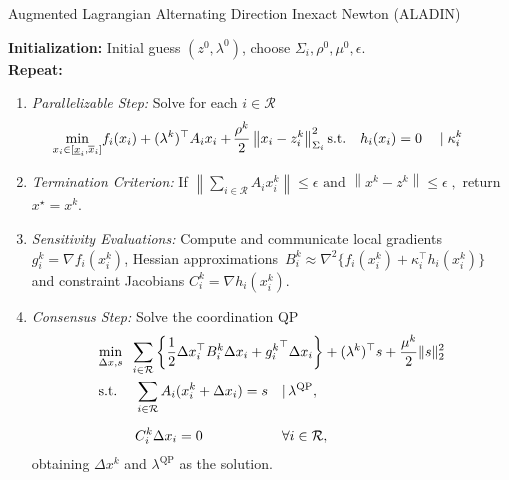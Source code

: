 \documentclass[]{scrartcl}
\begin{document}
\begin{algorithm}
	
	\caption{Augmented Lagrangian Alternating Direction Inexact Newton (ALADIN)}
	\textbf{Initialization:} Initial guess $(z^0,\lambda^0)$, choose $\Sigma_i,\rho^0,\mu^0,\epsilon$. \\
	\textbf{Repeat:}
	\begin{enumerate}
		\item \textit{Parallelizable Step:} \label{step:parStep}
		Solve for each $i \in \mathcal{R}$
		\begin{align}
		\begin{split}
		\label{eq::denlp}
		\underset{x_i\in[\underline x_i, \overline x_i]}{\min}& f_i(x_i) + (\lambda^k)^\top A_i x_i + \hspace{-0.1em} \frac{\rho^k}{2}\left\|x_i-z_i^k\right\|_{\Sigma_i}^2
		\text{s.t.}\quad h_i(x_i) = 0 \quad \mid \kappa_i^k \quad 
		\end{split}	
		\end{align}
		\item \textit{Termination Criterion:} If 
		$
		\label{eq::stop}
		\left\|\sum_{i\in \mathcal{R}}A_ix^k_i\right\|\leq \epsilon \text{ and } \left\| x^k - z^k \right \|\leq \epsilon\;,
		$
		return $x^\star = x^k$.
		
		\item \textit{Sensitivity Evaluations:} Compute and communicate local gradients~$g_i^k=\nabla f_i(x_i^k)$,
		Hessian approximations~{$B_i^k \approx \nabla^2\{f_i(x_i^k)+\kappa_i^\top h_i(x_i^k)\}$} and constraint Jacobians $C^k_i = \nabla h_i(x^k_i)$. 
		
		\item \textit{Consensus Step:} Solve the coordination QP 
		\begin{align} 
		\notag
		&\underset{\Delta x,s}{\min}\;\;\sum_{i\in \mathcal{R}}\left\{\frac{1}{2}\Delta x_i^\top B^k_i\Delta x_i + {g_i^k}^\top \Delta x_i\right\}     + (\lambda^k)^\top s + \frac{\mu^k}{2}\|s\|^2_2  \\ 
		&\begin{aligned}\label{eq:coordQP}
		\text{s.t.}\;                                  &\quad \sum_{i\in \mathcal{R}}A_i(x^k_i+\Delta x_i) =  s     &&|\, \lambda^\mathrm{QP},\\[0.2cm]
		&\quad C^k_i \Delta x_i = 0                                    &&\forall i\in \mathcal{R},
		\end{aligned}
		\end{align}
		obtaining $\Delta x^k$ and $\lambda^{\text{QP}}$ as the solution.
		

\end{enumerate}
\end{algorithm}
\end{document}
